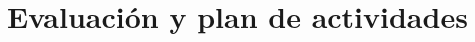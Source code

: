 \documentclass[a4paper,12pt]{article}
\begin{document}
\renewcommand{\refname}{Bibliograf\'ia}
%
%
%
%
%
%
%
%
%
%
%
%
%
%

\section*{Evaluaci\'on y plan de actividades}

%
%
%
%

%
%
%




\end{document}
